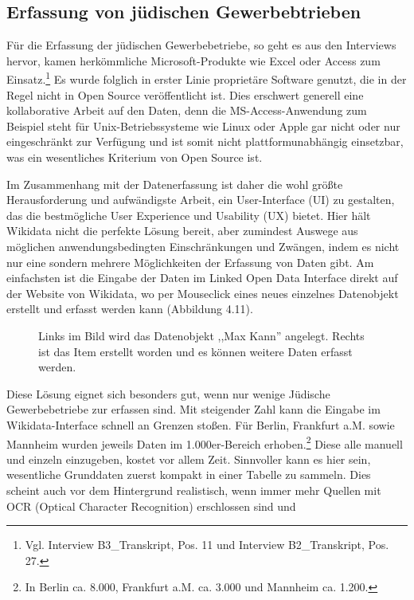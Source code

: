 \subsection{Erfassung von jüdischen Gewerbebtrieben}

Für die Erfassung der jüdischen Gewerbebetriebe, so geht es aus den Interviews hervor, kamen herkömmliche Microsoft-Produkte wie Excel oder Access zum Einsatz.\footnote{Vgl. Interview B3\_Transkript, Pos. 11 und Interview B2\_Transkript, Pos. 27.} Es wurde folglich in erster Linie proprietäre Software genutzt, die in der Regel nicht in Open Source veröffentlicht ist. Dies erschwert generell eine kollaborative Arbeit auf den Daten, denn die MS-Access-Anwendung zum Beispiel steht für Unix-Betriebssysteme wie Linux oder Apple gar nicht oder nur eingeschränkt zur Verfügung und ist somit nicht plattformunabhängig einsetzbar, was ein wesentliches Kriterium von Open Source ist. 

Im Zusammenhang mit der Datenerfassung ist daher die wohl größte Herausforderung und aufwändigste Arbeit, ein User-Interface (UI) zu gestalten, das die bestmögliche User Experience und Usability (UX) bietet. Hier hält Wikidata nicht die perfekte Lösung bereit, aber zumindest Auswege aus möglichen anwendungsbedingten Einschränkungen und Zwängen, indem es nicht nur eine sondern mehrere Möglichkeiten der Erfassung von Daten gibt. Am einfachsten ist die Eingabe der Daten im Linked Open Data Interface direkt auf der Website von Wikidata, wo per Mouseclick eines neues einzelnes Datenobjekt erstellt und erfasst werden kann (Abbildung 4.11). 

\begin{figure}[h]
    \centering
    \caption{Links im Bild wird das Datenobjekt ,,Max Kann'' angelegt. Rechts ist das Item erstellt worden und es können weitere Daten erfasst werden.}
    \label{fig:x cubed graph}
\end{figure}

Diese Lösung eignet sich besonders gut, wenn nur wenige Jüdische Gewerbebetriebe zur erfassen sind. Mit steigender Zahl kann die Eingabe im Wikidata-Interface schnell an Grenzen stoßen. Für Berlin, Frankfurt a.M. sowie Mannheim wurden jeweils Daten im 1.000er-Bereich erhoben.\footnote{In Berlin ca. 8.000, Frankfurt a.M. ca. 3.000 und Mannheim ca. 1.200.} Diese alle manuell und einzeln einzugeben, kostet vor allem Zeit. Sinnvoller kann es hier sein, wesentliche Grunddaten zuerst kompakt in einer Tabelle zu sammeln. Dies scheint auch vor dem Hintergrund realistisch, wenn immer mehr Quellen mit OCR (Optical Character Recognition) erschlossen sind und 


